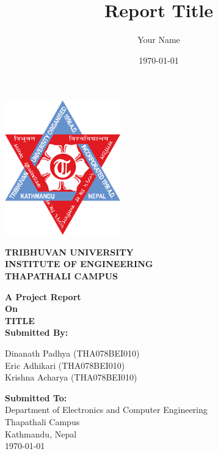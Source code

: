 \documentclass{report}
\title{Report Title}
\author{Your Name}
\date{\today}
\begin{document}
\begin{titlepage}
    \noindent
    \begin{center}
        \includegraphics[width=5cm]{img/logo.png}

        {\fontsize{12}{14.4} \bfseries \centering TRIBHUVAN UNIVERSITY \\ INSTITUTE OF ENGINEERING \\ THAPATHALI CAMPUS \\ }

        \vspace{1.5cm}
        {\bfseries A Project Report \\ On \\ TITLE \linebreak[5] \\ Submitted By: \\ }

        Dinanath Padhya (THA078BEI010) \\
        Eric Adhikari (THA078BEI010) \\
        Krishna Acharya (THA078BEI010) \linebreak[4]

        {\bfseries Submitted To:} \\
        Department of Electronics and Computer Engineering \\
        Thapathali Campus \\
        Kathmandu, Nepal \linebreak[5] \\
        \today \\
    \end{center}
\end{titlepage}






\tableofcontents
\listoffigures
\listoftables

% 
% 
% 
% 
%
% 
%
\end{document}
